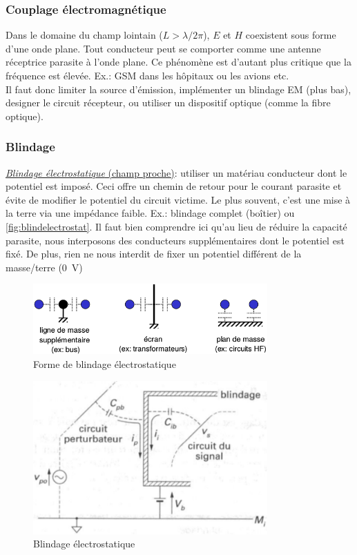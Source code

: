 \subsubsection{Couplage électromagnétique}
Dans le domaine du champ lointain (\(L>\lambda/2\pi\)), \(E\) et \(H\) coexistent sous forme d'une onde plane. Tout conducteur peut se comporter comme une antenne réceptrice parasite à l'onde plane. Ce phénomène est d'autant plus critique que la fréquence est élevée. Ex.: GSM dans les hôpitaux ou les avions etc.\\

Il faut donc limiter la source d'émission, implémenter un blindage EM (plus bas), designer le circuit récepteur, ou  utiliser un dispositif optique (comme la fibre optique).
\subsubsection{Blindage}
\underline{\textit{Blindage électrostatique} (champ proche)}: utiliser un matériau conducteur dont le potentiel est imposé. Ceci offre un chemin de retour pour le courant parasite et évite de modifier le potentiel du circuit victime. Le plus souvent, c'est une mise à la terre via une impédance faible. Ex.: blindage complet (boîtier) ou \autoref{fig:blindelectrostat}. Il faut bien comprendre ici qu'au lieu de réduire la capacité parasite, nous interposons des conducteurs supplémentaires dont le potentiel est fixé. De plus, rien ne nous interdit de fixer un potentiel différent de la masse/terre (\SI{0}{\volt})
\begin{figure}[H] 
	\centering 
	\includegraphics[width=0.8\textwidth,height=10\baselineskip,keepaspectratio]{ch3/image6} 
	\caption{Forme de blindage électrostatique}
	\label{fig:blindelectrostat}
\end{figure}
\begin{figure}[H] 
	\centering 
	\includegraphics[width=0.8\textwidth,height=10\baselineskip,keepaspectratio]{ch3/image7} 
	\caption{Blindage électrostatique}
\end{figure}
